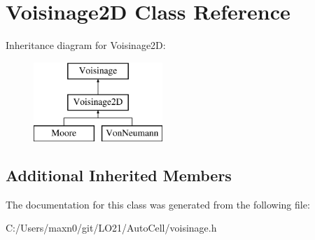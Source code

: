 \hypertarget{class_voisinage2_d}{}\section{Voisinage2D Class Reference}
\label{class_voisinage2_d}
Inheritance diagram for Voisinage2D\+:\begin{figure}[H]
\begin{center}
\leavevmode
\includegraphics[height=3.000000cm]{class_voisinage2_d}
\end{center}
\end{figure}
\subsection*{Additional Inherited Members}


The documentation for this class was generated from the following file\+:\begin{DoxyCompactItemize}
\item 
C\+:/\+Users/maxn0/git/\+L\+O21/\+Auto\+Cell/voisinage.\+h\end{DoxyCompactItemize}
